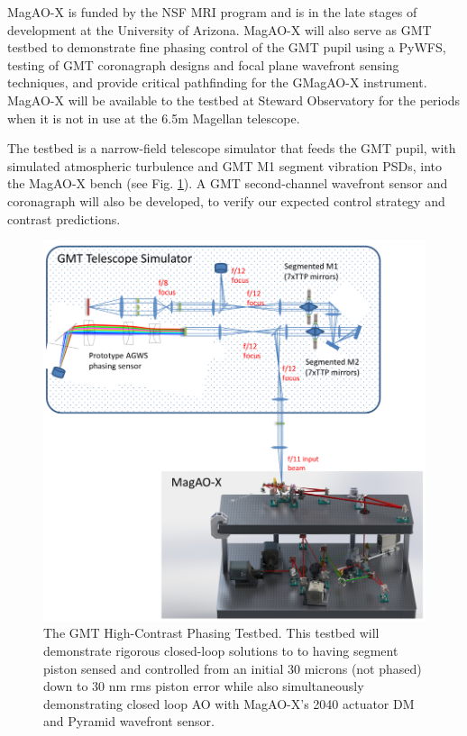 \documentclass[12pt,preprint]{aastex}
\begin{document}
MagAO-X is funded by the NSF MRI program and is in the late stages of development at the University of Arizona. MagAO-X will also serve as GMT testbed to demonstrate fine phasing control of the GMT pupil using a PyWFS, testing of GMT coronagraph designs and focal plane wavefront sensing techniques, and provide critical pathfinding for the GMagAO-X instrument. MagAO-X will be available to the testbed at Steward Observatory for the periods when it is not in use at the 6.5m Magellan telescope. 

The testbed is a narrow-field telescope simulator that feeds the GMT pupil, with simulated atmospheric turbulence and GMT M1 segment vibration PSDs, into the MagAO-X bench (see Fig. \ref{fig:testbed}). A GMT second-channel wavefront sensor and coronagraph will also be developed, to verify our expected control strategy and contrast predictions. 
 
 \begin{figure} [h!]
\centering
\includegraphics[width=5in]{figures/Testbed_figure.png}
\caption{The GMT High-Contrast Phasing Testbed. This testbed will demonstrate rigorous closed-loop solutions to to having segment piston sensed and controlled from an initial 30 microns (not phased) down to 30 nm rms piston error while also simultaneously demonstrating closed loop AO with MagAO-X's 2040 actuator DM and Pyramid wavefront sensor.  \label{fig:testbed}}
\end{figure}
 
\end{document}
